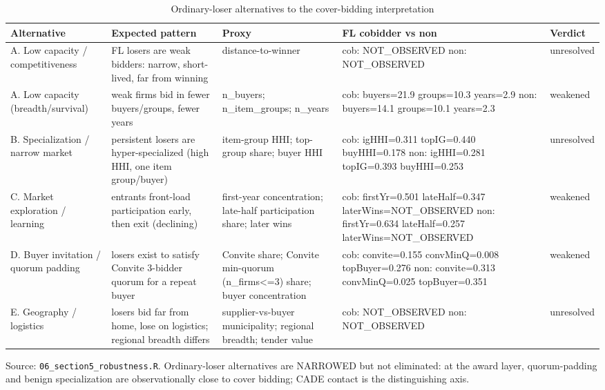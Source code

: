 \begin{table}[htbp]\centering\footnotesize
\caption{Ordinary-loser alternatives to the cover-bidding interpretation}
\label{tab:ordinary_loser_alternatives}
\begin{tabular}{p{2.4cm}p{2.4cm}p{2.4cm}p{2.4cm}p{1.4cm}}\hline
Alternative & Expected pattern & Proxy & FL cobidder vs non & Verdict \\\hline
A. Low capacity / competitiveness & FL losers are weak bidders: narrow, short-lived, far from winning & distance-to-winner & cob: NOT\_OBSERVED \newline non: NOT\_OBSERVED & unresolved \\
A. Low capacity (breadth/survival) & weak firms bid in fewer buyers/groups, fewer years & n\_buyers; n\_item\_groups; n\_years & cob: buyers=21.9 groups=10.3 years=2.9 \newline non: buyers=14.1 groups=10.1 years=2.3 & weakened \\
B. Specialization / narrow market & persistent losers are hyper-specialized (high HHI, one item group/buyer) & item-group HHI; top-group share; buyer HHI & cob: igHHI=0.311 topIG=0.440 buyHHI=0.178 \newline non: igHHI=0.281 topIG=0.393 buyHHI=0.253 & unresolved \\
C. Market exploration / learning & entrants front-load participation early, then exit (declining) & first-year concentration; late-half participation share; later wins & cob: firstYr=0.501 lateHalf=0.347 laterWins=NOT\_OBSERVED \newline non: firstYr=0.634 lateHalf=0.257 laterWins=NOT\_OBSERVED & weakened \\
D. Buyer invitation / quorum padding & losers exist to satisfy Convite 3-bidder quorum for a repeat buyer & Convite share; Convite min-quorum (n\_firms<=3) share; buyer concentration & cob: convite=0.155 convMinQ=0.008 topBuyer=0.276 \newline non: convite=0.313 convMinQ=0.025 topBuyer=0.351 & weakened \\
E. Geography / logistics & losers bid far from home, lose on logistics; regional breadth differs & supplier-vs-buyer municipality; regional breadth; tender value & cob: NOT\_OBSERVED \newline non: NOT\_OBSERVED & unresolved \\
\hline\end{tabular}
\begin{tablenotes}\footnotesize\item Source: \texttt{06\_section5\_robustness.R}. 
Ordinary-loser alternatives are NARROWED but not eliminated: at the award layer, quorum-padding 
and benign specialization are observationally close to cover bidding; CADE contact is the distinguishing axis.
\end{tablenotes}\end{table}
